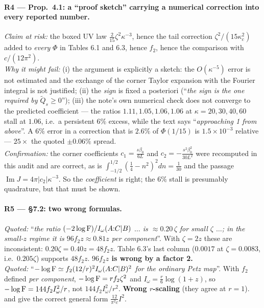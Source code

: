 \documentclass[11pt]{article}
\newcommand{\zz}{\zeta}
\begin{document}
\paragraph{R4 --- \NV{} Prop.~4.1: a ``proof sketch'' carrying a numerical correction into every reported number.}
\emph{Claim at risk:} the boxed UV law $\frac2{15}\zz^2\kappa^{-3}$, hence the tail correction
$\zz^2/(15\kappa_c^2)$ added to \emph{every} $\Phi$ in Tables 6.1 and 6.3, hence $f_2$, hence the comparison with
$c/(12\pi^2)$.\\
\emph{Why it might fail:} (i) the argument is explicitly a sketch: the $O(\kappa^{-5})$ error is not estimated and the
exchange of the corner Taylor expansion with the Fourier integral is not justified; (ii) the \emph{sign} is fixed a
posteriori (``\emph{the sign is the one required by $\widetilde Q_s\ge0$}''); (iii) the note's own numerical check does
not converge to the predicted coefficient --- the ratios $1.11,1.05,1.06,1.06$ at $\kappa=20,30,40,60$ stall at
$1.06$, i.e.\ a persistent $6\%$ excess, while the text says ``\emph{approaching 1 from above}''.  A $6\%$ error in a
correction that is $2.6\%$ of $\Phi(1/15)$ is $1.5\times10^{-3}$ relative --- $25\times$ the quoted $\pm0.06\%$ spread.\\
\emph{Confirmation:} the corner coefficients $c_1=\frac{s\beta_0}{6L}$ and $c_2=-\frac{s^2\beta_0^2}{30L^2}$ were
recomputed in this audit and are correct, as is $\int_{-1/2}^{1/2}(\frac14-n^2)^2dn=\frac1{30}$ and the passage
$\operatorname{Im}J=4\pi|c_2|\kappa^{-3}$.  So the \emph{coefficient} is right; the $6\%$ stall is presumably
quadrature, but that must be shown.

\paragraph{R5 --- \NV{} \S7.2: two wrong formulas.}
\emph{Quoted:} ``\emph{the ratio $(-2\log\operatorname{F})/I_\omega(A{:}C|B)$ $\dots$ is $\approx0.20\,\zz$ for small $\zz$ $\dots$;
in the small-$z$ regime it is $96f_2z\approx0.81z$ per component}''.  With $\zz=2z$ these are inconsistent:
$0.20\zz=0.40z=48f_2z$.  Table 6.3's last column ($0.0017$ at $\zz=0.0083$, i.e.\ $0.205\zz$) supports $48f_2z$.
\textbf{$96f_2z$ is wrong by a factor 2.}\\
\emph{Quoted:} ``\emph{$-\log\operatorname{F}\simeq f_2(12/r)^2I_\omega(A{:}C|B)^2$ for the ordinary Petz map}''.  With $f_2$ defined
\emph{per component}, $-\log\Fid=r f_2\zz^2$ and $I_\omega=\frac r6\log(1+z)$, so
$-\log\operatorname{F}=144f_2I_\omega^2/r$, not $144f_2I_\omega^2/r^2$.  \textbf{Wrong $r$-scaling} (they agree at $r=1$).
\NVI{} and \NVII{} give the correct general form $\frac{12}{\pi^2c}I^2$.
\end{document}
